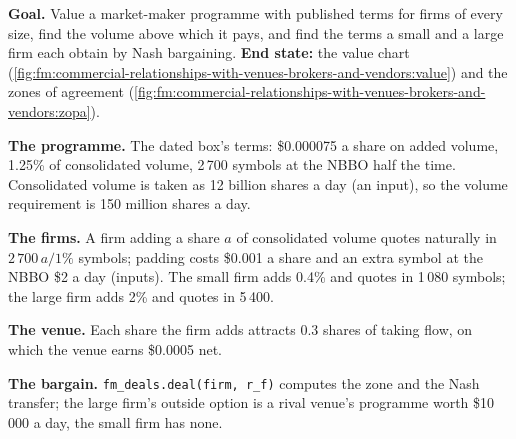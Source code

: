 \begin{tutorial}
\textbf{Goal.} Value a market-maker programme with published terms for firms of every size, find the volume above which it pays, and find the terms
a small and a large firm each obtain by Nash bargaining. \textbf{End state:} the value chart (\cref{fig:fm:commercial-relationships-with-venues-brokers-and-vendors:value})
and the zones of agreement (\cref{fig:fm:commercial-relationships-with-venues-brokers-and-vendors:zopa}).
\begin{tutsteps}
\item \textbf{The programme.} The dated box's terms: \$0.000075 a share on added volume, 1.25\% of consolidated volume, 2\,700 symbols at the NBBO
half the time. Consolidated volume is taken as 12 billion shares a day (an input), so the volume requirement is 150 million shares a day.
\item \textbf{The firms.} A firm adding a share $a$ of consolidated volume quotes naturally in $2\,700\,a/1\%$ symbols; padding costs \$0.001 a
share and an extra symbol at the NBBO \$2 a day (inputs). The small firm adds 0.4\% and quotes in 1\,080 symbols; the large firm adds 2\% and quotes
in 5\,400.
\item \textbf{The venue.} Each share the firm adds attracts 0.3 shares of taking flow, on which the venue earns \$0.0005 net.
\item \textbf{The bargain.} \texttt{fm\_deals.deal(firm, r\_f)} computes the zone and the Nash transfer; the large firm's outside option is a rival
venue's programme worth \$10\,000 a day, the small firm has none.
\end{tutsteps}
\end{tutorial}

\begin{omfigure}

\label{fig:fm:commercial-relationships-with-venues-brokers-and-vendors:value}
\end{omfigure}


